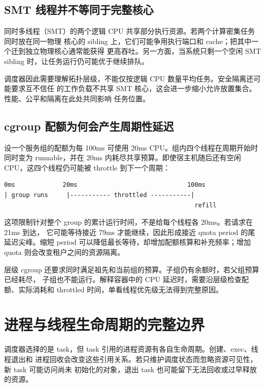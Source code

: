 \subsection{SMT 线程并不等同于完整核心}

同时多线程（SMT）的两个逻辑 CPU 共享部分执行资源。若两个计算密集任务同时放在同一物理
核心的 sibling 上，它们可能争用执行端口和 cache；把其中一个迁到独立物理核心通常能获得
更高吞吐。另一方面，当系统只剩一个空闲 SMT sibling 时，让任务运行仍可能优于继续排队。

调度器因此需要理解拓扑层级，不能仅按逻辑 CPU 数量平均任务。安全隔离还可能要求互不信任
的工作负载不共享 SMT 核心，这会进一步缩小允许放置集合。性能、公平和隔离在此处共同影响
任务位置。

\subsection{cgroup 配额为何会产生周期性延迟}

设一个服务组的配额为每 100ms 可使用 20ms CPU。组内四个线程在周期开始时同时变为
runnable，并在 20ms 内耗尽共享预算。即使宿主机随后还有空闲 CPU，这四个线程仍可能被
throttle 到下一个周期：

\begin{lstlisting}
0ms             20ms                              100ms
| group runs     |----------- throttled -----------|
                                                    refill
\end{lstlisting}

这项限制针对整个 group 的累计运行时间，不是给每个线程各 20ms。若请求在 21ms 到达，
它可能等待接近 79ms 才能继续，因此形成接近 quota period 的尾延迟尖峰。缩短 period
可以降低最长等待，却增加配额核算和补充频率；增加 quota 则会改变租户之间的资源隔离。

层级 cgroup 还要求同时满足祖先和当前组的预算。子组仍有余额时，若父组预算已经耗尽，
子组也不能运行。解释容器中的 CPU 延迟时，需要沿层级检查配额、实际消耗和 throttled
时间，单看线程优先级无法得到完整原因。

\section{进程与线程生命周期的完整边界}

调度器选择的是 task，但 task 引用的进程资源有各自生命周期。创建、exec、线程退出和
进程回收会改变这些引用关系。若只维护调度状态而忽略资源可见性，新 task 可能访问尚未
初始化的对象，退出 task 也可能留下无法回收或过早释放的资源。

